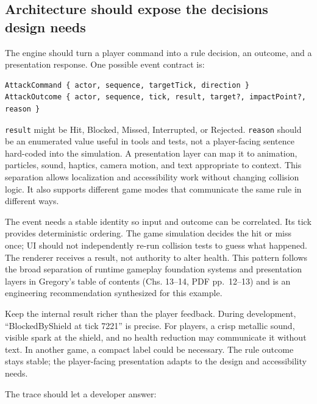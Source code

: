 \subsection{Architecture should expose the decisions design needs}\label{06-engine-ii-ch032-architecture-should-expose-the-decisions-design-needs}

\hypertarget{06-engine-ii-ch032-architecture-should-expose-the-decisions-design-needs}{}

The engine should turn a player command into a rule decision, an outcome, and a presentation response. One possible event contract is:

\begin{verbatim}
AttackCommand { actor, sequence, targetTick, direction }
AttackOutcome { actor, sequence, tick, result, target?, impactPoint?, reason }
\end{verbatim}

\texttt{result} might be Hit, Blocked, Missed, Interrupted, or Rejected. \texttt{reason} should be an enumerated value useful in tools and tests, not a player-facing sentence hard-coded into the simulation. A presentation layer can map it to animation, particles, sound, haptics, camera motion, and text appropriate to context. This separation allows localization and accessibility work without changing collision logic. It also supports different game modes that communicate the same rule in different ways.

The event needs a stable identity so input and outcome can be correlated. Its tick provides deterministic ordering. The game simulation decides the hit or miss once; UI should not independently re-run collision tests to guess what happened. The renderer receives a result, not authority to alter health. This pattern follows the broad separation of runtime gameplay foundation systems and presentation layers in Gregory's table of contents (Chs. 13--14, PDF pp.~12--13) and is an engineering recommendation synthesized for this example.

Keep the internal result richer than the player feedback. During development, ``BlockedByShield at tick 7221'' is precise. For players, a crisp metallic sound, visible spark at the shield, and no health reduction may communicate it without text. In another game, a compact label could be necessary. The rule outcome stays stable; the player-facing presentation adapts to the design and accessibility needs.

The trace should let a developer answer:

